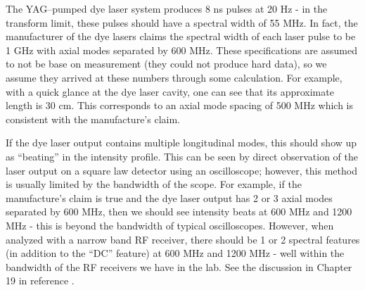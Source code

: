 The YAG--pumped dye laser system produces 8 ns pulses at 20 Hz - in the transform limit, these pulses should have a spectral width of 55 MHz. In fact, the manufacturer of the dye lasers claims the spectral width of each laser pulse to be 1 GHz with axial modes separated by 600 MHz. These specifications are assumed to not be base on measurement (they could not produce hard data), so we assume they arrived at these numbers through some calculation. For example, with a quick glance at the dye laser cavity, one can see that its approximate length is 30 cm. This corresponds to an axial mode spacing of 500 MHz which is consistent with the manufacture's claim.

If the dye laser output contains multiple longitudinal modes, this should show up as ``beating'' in the intensity profile. This can be seen by direct observation of the laser output on a square law detector using an oscilloscope; however, this method is usually limited by the bandwidth of the scope. For example, if the manufacture's claim is true and the dye laser output has 2 or 3 axial modes separated by 600 MHz, then we should see intensity beats at 600 MHz and 1200 MHz - this is beyond the bandwidth of typical oscilloscopes. However, when analyzed with a narrow band RF receiver, there should be 1 or 2 spectral features (in addition to the ``DC'' feature) at 600 MHz and 1200 MHz - well within the bandwidth of the RF receivers we have in the lab. See the discussion in Chapter 19 in reference \cite{Siegman:1986a}.
